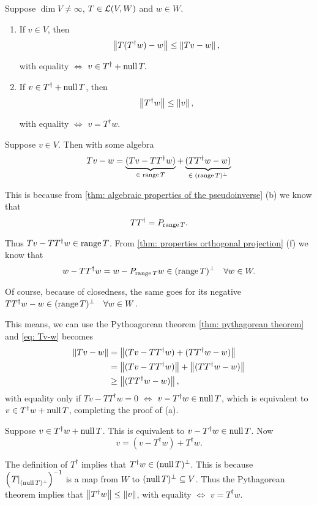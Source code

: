 \begin{thm}
  Suppose $\dim V \neq \infty$, $T \in \mathcal{L}(V,W)$ and $w\in W$.
  \begin{enumerate}[label=(\alph*)]
    \item If $v \in V$, then
    \[
      \left \lVert T(T^\dagger w)-w \right \rVert \leq \left \lVert Tv -w \right \rVert,
    \]

    with equality $\iff$ $v \in T^\dagger + \operatorname{null} T.$

    \item If $v \in T^\dagger + \operatorname{null} T$, then
    \[
      \left \lVert T^\dagger w \right \rVert \leq \left \lVert v \right \rVert,
    \]

    with equality $\iff$ $v=T^\dagger w$.
  \end{enumerate}
\end{thm}
\begin{prf}
  Suppose $v\in V$. Then with some algebra
  \begin{equation}
    \label{eq: Tv-w}
    Tv -w = \underbrace{(Tv-TT^\dagger w)}_{\in \; \operatorname{range} T} + \underbrace{(TT^\dagger w -w)}_{\in \; (\operatorname{range} T)^\bot}
  \end{equation}

  This is because from \ref{thm: algebraic properties of the pseudoinverse} (b) we know that
  \[
    TT^\dagger = P_{\operatorname{range} T}.
  \]

  Thus $Tv-TT^\dagger w\in \operatorname{range} T$. From \ref{thm: properties orthogonal projection} (f) we know that
  \[
    w-TT^\dagger w = w-P_{\operatorname{range} T} w \in (\operatorname{range} T)^\bot \quad \forall w \in W.
  \]

  Of course, because of closedness, the same goes for its negative $TT^\dagger w-w \in (\operatorname{range} T)^\bot \quad \forall w \in W$.

  This means, we can use the Pythoagorean theorem \ref{thm: pythagorean theorem} and \eqref{eq: Tv-w} becomes
  \[
    \begin{aligned}
      \left \lVert Tv-w \right \rVert &= \left \lVert (Tv-TT^\dagger w) + (TT^\dagger w -w) \right \rVert \\
      &= \left \lVert (Tv-TT^\dagger w) \right \rVert + \left \lVert (TT^\dagger w -w) \right \rVert \\
      &\geq \left \lVert (TT^\dagger w -w) \right \rVert,
    \end{aligned}
  \]
  with equality only if $Tv - TT^\dagger w=0$ $\iff$ $v-T^\dagger w \in \operatorname{null} T$, which is equivalent to $v\in T^\dagger w + \operatorname{null} T$, completing the proof of (a).

   Suppose $v \in T^\dagger w + \operatorname{null} T$. This is equivalent to $v-T^\dagger w \in \operatorname{null} T$. Now
  \[
    v = (v-T^\dagger w) + T^\dagger w.
  \]

  The definition of $T^\dagger$ implies that $T^\dagger w \in (\operatorname{null} T)^\bot$. This is because $\left( \left. T \right|_{(\operatorname{null} T)^\bot} \right)^{-1}$ is a map from $W$ to $(\operatorname{null} T)^\bot \subseteq V$. Thus the Pythagorean theorem implies that $\left \lVert  T^\dagger w \right \rVert \leq \left \lVert v \right \rVert$, with equality $\iff$ $v=T^\dagger w$.
\end{prf}